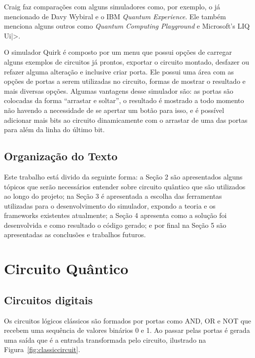 \documentclass[a4paper, 12pt, oneside]{book}
\begin{document}
Craig faz comparações com alguns simuladores como, por exemplo, o já mencionado de Davy Wybiral e o IBM \textit{Quantum Experience}. Ele também menciona alguns outros como \textit{Quantum Computing Playground} e Microsoft's LIQ Ui|>.

O simulador Quirk é composto por um menu que possui opções de carregar alguns exemplos de circuitos já prontos, exportar o circuito montado, desfazer ou refazer alguma alteração e inclusive criar porta. Ele possui uma área com as opções de portas a serem utilizadas no circuito, formas de mostrar o resultado e mais diversas opções. Algumas vantagens desse simulador são: as portas são colocadas da forma ``arrastar e soltar'', o resultado é mostrado a todo momento não havendo a necessidade de se apertar um botão para isso, e é possível adicionar mais bits ao circuito dinamicamente com o arrastar de uma das portas para além da linha do último bit.

\section{Organização do Texto}

Este trabalho está divido da seguinte forma: a Seção 2 são apresentados alguns tópicos que serão necessários entender sobre circuito quântico que são utilizados ao longo do projeto; na Seção 3 é apresentada a escolha das ferramentas utilizadas para o desenvolvimento do simulador, expondo a teoria e os frameworks existentes atualmente; a Seção 4 apresenta como a solução foi desenvolvida e como resultado o código gerado; e por final na Seção 5 são apresentadas as conclusões e trabalhos futuros.

\chapter{Circuito Quântico}

\section{Circuitos digitais}
Os circuitos lógicos clássicos são formados por portas como AND, OR e NOT que recebem uma sequência de valores binários 0 e 1. Ao passar pelas portas é gerada uma saída que é a entrada transformada pelo circuito, ilustrado na Figura~\ref{fig:classiccircuit}.
\end{document}

